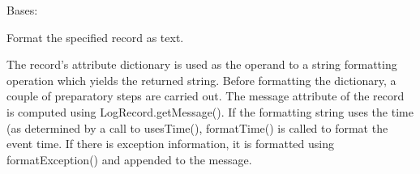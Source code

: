 \documentclass[a4paper,10pt,english]{sphinxmanual}
\begin{document}
\begin{fulllineitems}
\label{\detokenize{apidoc_src/src:src.loggingSat.DefaultFormatter}}
Bases: 

\begin{fulllineitems}
\label{\detokenize{apidoc_src/src:src.loggingSat.DefaultFormatter.format}}
Format the specified record as text.

The record’s attribute dictionary is used as the operand to a
string formatting operation which yields the returned string.
Before formatting the dictionary, a couple of preparatory steps
are carried out. The message attribute of the record is computed
using LogRecord.getMessage(). If the formatting string uses the
time (as determined by a call to usesTime(), formatTime() is
called to format the event time. If there is exception information,
it is formatted using formatException() and appended to the message.

\end{fulllineitems}


\begin{fulllineitems}
\label{\detokenize{apidoc_src/src:src.loggingSat.DefaultFormatter.setColorLevelname}}
\end{fulllineitems}


\end{fulllineitems}

\end{document}
